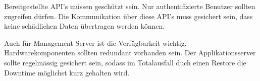 Bereitgestellte API's müssen geschützt sein. Nur authentifizierte Benutzer sollten zugreifen dürfen. Die Kommunikation über diese API's muss gesichert sein, dass keine schädlichen Daten übertragen werden können. 

Auch für Management Server ist die Verfügbarkeit wichtig. Hardwarekomponenten sollten redundant vorhanden sein. Der Applikationsserver sollte regelmässig gesichert sein, sodass im Totalausfall duch einen Restore die Downtime möglichst kurz gehalten wird.




